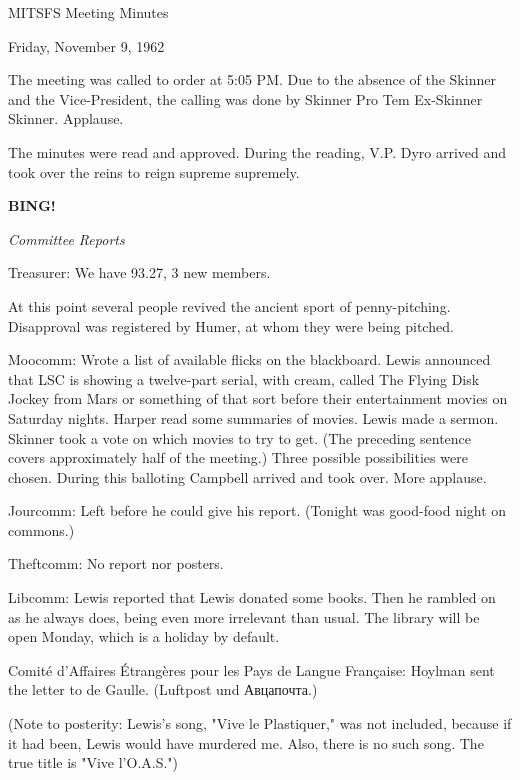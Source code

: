 \documentclass[12pt]{article}
\newcommand{\bing}{{\bf BING!} }
\newcommand{\goto}[1]{\bing \vskip 12pt \centerline{{\em{#1}}}}
\begin{document}
\begin{center}

MITSFS Meeting Minutes

Friday, November 9, 1962

\end{center}
 
\vspace{12pt}

\setlength{\parskip}{6pt}

\noindent
The meeting was called to order at 5:05 PM. Due to the absence of the Skinner and the Vice-President, the calling was done by Skinner Pro Tem Ex-Skinner Skinner. Applause.

The minutes were read and approved. During the reading, V.P. Dyro arrived and took over the reins to reign supreme supremely.

\goto{Committee Reports}

Treasurer: We have 93.27, 3 new members.

At this point several people revived the ancient sport of penny-pitching. Disapproval was registered by Humer, at whom they were being pitched.

Moocomm: Wrote a list of available flicks on the blackboard. Lewis announced that LSC is showing a twelve-part serial, with cream, called The Flying Disk Jockey from Mars or something of that sort before their entertainment movies on Saturday nights. Harper read some summaries of movies. Lewis made a sermon. Skinner took a vote on which movies to try to get. (The preceding sentence covers approximately half of the meeting.) Three possible possibilities were chosen. During this balloting Campbell arrived and took over. More applause.

Jourcomm: Left before he could give his report. (Tonight was good-food night on commons.)

Theftcomm: No report nor posters.

Libcomm: Lewis reported that Lewis donated some books. Then he rambled on as he always does, being even more irrelevant than usual. The library will be open Monday, which is a holiday by default.

Comit\'e d'Affaires \'Etrang\`eres pour les Pays de Langue Fran\c caise: Hoylman sent the letter to de Gaulle. (Luftpost und Авцапочта.)

(Note to posterity: Lewis's song, "Vive le Plastiquer," was not included, because if it had been, Lewis would have murdered me. Also, there is no such song. The true title is "Vive l'O.A.S.")
\end{document}
